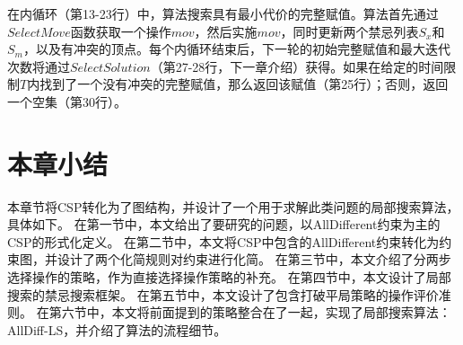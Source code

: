 在内循环（第13-23行）中，算法搜索具有最小代价的完整赋值。算法首先通过$SelectMove$函数获取一个操作$mov$，然后实施$mov$，同时更新两个禁忌列表$S_x$和$S_m$，以及有冲突的顶点。每个内循环结束后，下一轮的初始完整赋值和最大迭代次数将通过$SelectSolution$（第27-28行，下一章介绍）获得。如果在给定的时间限制$T$内找到了一个没有冲突的完整赋值，那么返回该赋值（第25行）；否则，返回一个空集（第30行）。

\section{本章小结}

本章节将CSP转化为了图结构，并设计了一个用于求解此类问题的局部搜索算法，具体如下。
在第一节中，本文给出了要研究的问题，以AllDifferent约束为主的CSP的形式化定义。
在第二节中，本文将CSP中包含的AllDifferent约束转化为约束图，并设计了两个化简规则对约束进行化简。
在第三节中，本文介绍了分两步选择操作的策略，作为直接选择操作策略的补充。
在第四节中，本文设计了局部搜索的禁忌搜索框架。
在第五节中，本文设计了包含打破平局策略的操作评价准则。
在第六节中，本文将前面提到的策略整合在了一起，实现了局部搜索算法：AllDiff-LS，并介绍了算法的流程细节。
